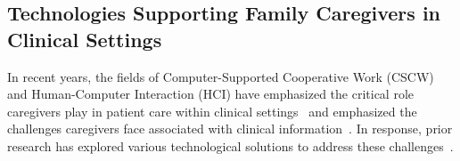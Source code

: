 






\subsection{Technologies Supporting Family Caregivers in Clinical Settings}


In recent years, the fields of Computer-Supported Cooperative Work (CSCW) and Human-Computer Interaction (HCI) have emphasized the critical role caregivers play in patient care within clinical settings~\cite{Don2024, Siddiqui2023, Yunan2013} and emphasized the challenges caregivers face associated with clinical information~\cite{Stefanidi2023}. In response, prior research has explored various technological solutions to address these challenges~\cite{Pine2018}.

